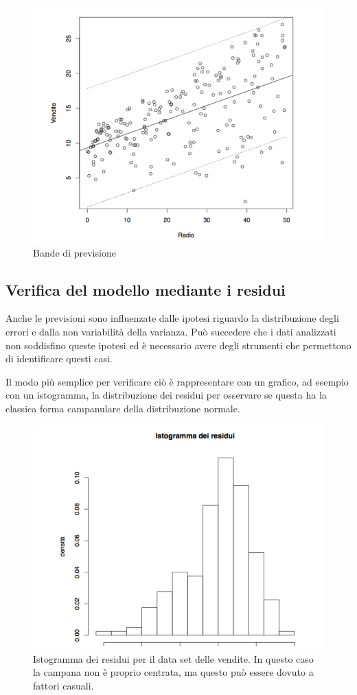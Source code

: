 \begin{figure}[htbp]
\centering
\includegraphics[width=.6\textwidth]{./notes/immagini/l6-fig10-1.png}
\caption{Bande di previsione}
\end{figure}

\subsection{Verifica del modello mediante i residui}

Anche le previsioni sono influenzate dalle ipotesi riguardo la distribuzione degli errori e dalla non variabilità della varianza.
Può succedere che i dati analizzati non soddisfino queste ipotesi ed è necessario avere degli strumenti che permettono di identificare questi casi.

Il modo più semplice per verificare ciò è rappresentare con un grafico, ad esempio con un istogramma, la distribuzione dei residui per osservare se questa ha la classica forma campanulare della distribuzione normale.

\begin{figure}[htbp]
\centering
\includegraphics[width=.5\textwidth]{./notes/immagini/l6-fig11-1.png}
\caption{Istogramma dei residui per il data set delle vendite. In questo caso la campana non è proprio centrata, ma questo può essere dovuto a fattori casuali.}
\end{figure}

